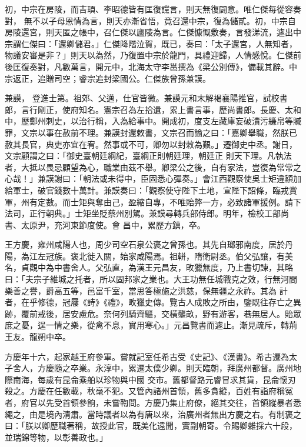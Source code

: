 \begin{pinyinscope}
 初，中宗在房陵，而吉頊、李昭德皆有匡復讜言，則天無復闢意。唯仁傑每從容奏對，
 無不以子母恩情為言，則天亦漸省悟，竟召還中宗，復為儲貳。初，中宗自房陵還宮，則天匿之帳中，召仁傑以廬陵為言。仁傑慷慨敷奏，言發涕流，遽出中宗謂仁傑曰：「還卿儲君。」仁傑降階泣賀，既已，奏曰：「太子還宮，人無知者，物議安審是非？」則天以為然，乃復置中宗於龍門，具禮迎歸，人情感悅。仁傑前後匡復奏對，凡數萬言，開元中，北海太守李邕撰為《梁公別傳》，備載其辭。中宗返正，追贈司空；睿宗追封梁國公。仁傑族曾孫兼謨。



 兼謨，
 登進士第。祖郊、父邁，仕官皆微。兼謨元和末解褐襄陽推官，試校書郎，言行剛正，使府知名。憲宗召為左拾遺，累上書言事，歷尚書郎。長慶、太和中，歷鄭州刺史，以治行稱，入為給事中。開成初，度支左藏庫妄破漬污縑帛等贓罪，文宗以事在赦前不理。兼謨封還敕書，文宗召而諭之曰：「嘉卿舉職，然朕已赦其長官，典吏亦宜在宥。然事或不可，卿勿以封敕為艱。」遷御史中丞。謝日，文宗顧謂之曰：「御史臺朝廷綱紀，臺綱正則朝廷理，朝廷正
 則天下理。凡執法者，大抵以畏忌顧望為心，職業由茲不舉。卿梁公之後，自有家法，豈復為常常之心哉！」兼謨謝曰：「朝法或未得中，臣固悉心彈奏。」會江西觀察使吳士矩違額加給軍士，破官錢數十萬計。兼謨奏曰：「觀察使守陛下土地，宣陛下詔條，臨戎賞軍，州有定數。而士矩與奪由己，盈縮自專，不唯貽弊一方，必致諸軍援例。請下法司，正行朝典。」士矩坐貶蔡州別駕。兼謨尋轉兵部侍郎。明年，檢校工部尚書、太原尹，充河東節度使。會
 昌中，累歷方鎮，卒。



 王方慶，雍州咸陽人也，周少司空石泉公褒之曾孫也。其先自瑯邪南度，居於丹陽，為江左冠族。褒北徙入關，始家咸陽焉。祖軿，隋衛尉丞。伯父弘讓，有美名，貞觀中為中書舍人。父弘直，為漢王元昌友，畋獵無度，乃上書切諫，其略曰：「夫宗子維城之托者，所以固邦家之業也。大王功無任城戰克之效，行無河間樂善之譽，爵高五等，邑富千室，當思答極施之洪慈，保無疆之永祚。其為
 計者，在乎修德，冠屨《詩》《禮》，畋獵史傳。覽古人成敗之所由，鑒既往存亡之異跡，覆前戒後，居安慮危。奈何列騎齊驅，交橫壟畝，野有游客，巷無居人。貽眾庶之憂，逞一情之樂，從禽不息，實用寒心。」元昌覽書而遽止。漸見疏斥，轉荊王友。龍朔中卒。



 方慶年十六，起家越王府參軍。嘗就記室任希古受《史記》、《漢書》。希古遷為太子舍人，方慶隨之卒業。永淳中，累遷太僕少卿。則天臨朝，拜廣州都督。廣州地際南海，每歲有昆侖乘舶以珍物與中國
 交市。舊都督路元睿冒求其貨，昆侖懷刃殺之。方慶在任數載，秋毫不犯。又管內諸州首領，舊多貪縱，百姓有詣府稱冤者，府官以先受首領參餉，未嘗鞫問。方慶乃集止府僚，絕其交往，首領縱暴者悉繩之，由是境內清肅。當時議者以為有唐以來，治廣州者無出方慶之右。有制褒之曰：「朕以卿歷職著稱，故授此官，既美化遠聞，實副朝寄。令賜卿雜採六十段，並瑞錦等物，以彰善政也。」




\end{pinyinscope}
